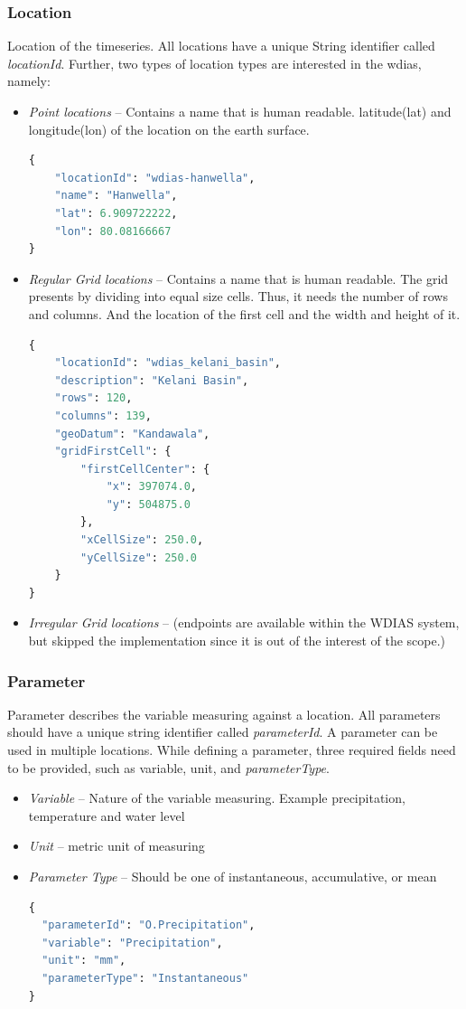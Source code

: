 \subsubsection{Location}
Location of the timeseries. All locations have a unique String identifier called \emph{locationId}. Further, two types of location types are interested in the \acrshort{wdias}, namely:
\begin{itemize}
  \item \emph{Point locations} -- Contains a name that is human readable. latitude(lat) and longitude(lon) of the location on the earth surface.
\begin{lstlisting}[language=Python]
{
    "locationId": "wdias-hanwella",
    "name": "Hanwella",
    "lat": 6.909722222,
    "lon": 80.08166667
}
\end{lstlisting}
  \item \emph{Regular Grid locations} -- Contains a name that is human readable. The grid presents by dividing into equal size cells. Thus, it needs the number of rows and columns. 
  And the location of the first cell and the width and height of it.
\begin{lstlisting}[language=Python]
{
    "locationId": "wdias_kelani_basin",
    "description": "Kelani Basin",
    "rows": 120,
    "columns": 139,
    "geoDatum": "Kandawala",
    "gridFirstCell": {
        "firstCellCenter": {
            "x": 397074.0,
            "y": 504875.0
        },
        "xCellSize": 250.0,
        "yCellSize": 250.0
    }
}
\end{lstlisting}
  \item \emph{Irregular Grid locations} -- (endpoints are available within the WDIAS system, but skipped the implementation since it is out of the interest of the scope.)
\end{itemize}

\subsubsection{Parameter}
Parameter describes the variable measuring against a location. All parameters should have a unique string identifier called \emph{parameterId}. A parameter can be used in multiple locations. While defining a parameter, three required fields need to be provided, such as variable, unit, and \emph{parameterType}.

\begin{itemize}  
  \item \emph{Variable} -- Nature of the variable measuring. Example precipitation, temperature and water level
  \item \emph{Unit} -- metric unit of measuring
  \item \emph{Parameter Type} -- Should be one of instantaneous, accumulative, or mean
\begin{lstlisting}[language=Python]
{
  "parameterId": "O.Precipitation",
  "variable": "Precipitation",
  "unit": "mm",
  "parameterType": "Instantaneous"
}
\end{lstlisting}
\end{itemize}

